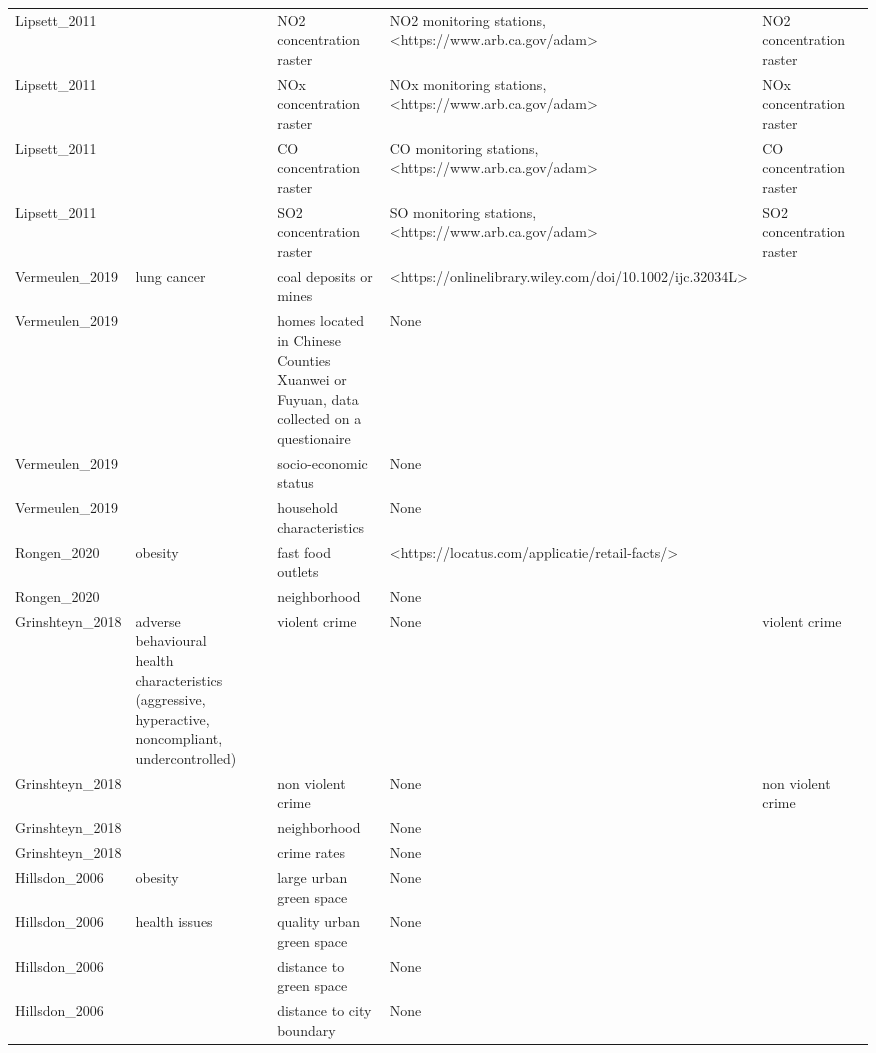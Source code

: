 \begin{tabular}{p{1cm}p{1cm}p{1cm}p{1cm}p{1cm}p{1cm}p{1cm}}
Lipsett\_2011 &  &  & NO2 concentration raster & NO2 monitoring stations, <https://www.arb.ca.gov/adam> & NO2 concentration raster &  \\
Lipsett\_2011 &  &  & NOx concentration raster & NOx monitoring stations, <https://www.arb.ca.gov/adam> & NOx concentration raster &  \\
Lipsett\_2011 &  &  & CO concentration raster & CO monitoring stations, <https://www.arb.ca.gov/adam> & CO concentration raster &  \\
Lipsett\_2011 &  &  & SO2 concentration raster & SO monitoring stations, <https://www.arb.ca.gov/adam> & SO2 concentration raster &  \\
Vermeulen\_2019 & lung cancer &  & coal deposits or mines & <https://onlinelibrary.wiley.com/doi/10.1002/ijc.32034L> &  &  \\
Vermeulen\_2019 &  &  & homes located in Chinese Counties Xuanwei or Fuyuan, data collected on a questionaire & None &  &  \\
Vermeulen\_2019 &  &  & socio-economic status & None &  &  \\
Vermeulen\_2019 &  &  & household characteristics & None &  &  \\
Rongen\_2020 & obesity &  & fast food outlets & <https://locatus.com/applicatie/retail-facts/> &  &  \\
Rongen\_2020 &  &  & neighborhood & None &  &  \\
Grinshteyn\_2018 & adverse behavioural health characteristics (aggressive, hyperactive, noncompliant, undercontrolled) &  & violent crime & None & violent crime &  \\
Grinshteyn\_2018 &  &  & non violent crime & None & non violent crime &  \\
Grinshteyn\_2018 &  &  & neighborhood & None &  &  \\
Grinshteyn\_2018 &  &  & crime rates & None &  &  \\
Hillsdon\_2006 & obesity &  & large urban green space & None &  &  \\
Hillsdon\_2006 & health issues &  & quality urban green space & None &  &  \\
Hillsdon\_2006 &  &  & distance to green space & None &  &  \\
Hillsdon\_2006 &  &  & distance to city boundary & None &  &  \\
\bottomrule
\end{tabular}
